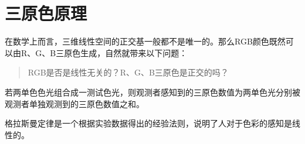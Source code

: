\begin{example}
  
\end{example}

\begin{definition}[绝对色彩空间]
  
\end{definition}

\section{三原色原理}
\label{sec:three-primary-color-theory}

在数学上而言，三维线性空间的正交基一般都不是唯一的。那么RGB颜色既然可以由R、G、B三原色生成，自然就带来以下问题：
\begin{quotation}
  RGB是否是线性无关的？{\color{red}R}、{\color{green}G}、{\color{blue}B}三原色是正交的吗？
\end{quotation}

\begin{theorem}
  若两单色色光组合成一测试色光，则观测者感知到的三原色数值为两单色光分别被观测者单独观测到的三原色数值之和。

  格拉斯曼定律是一个根据实验数据得出的经验法则，说明了人对于色彩的感知是线性的。
\end{theorem}
